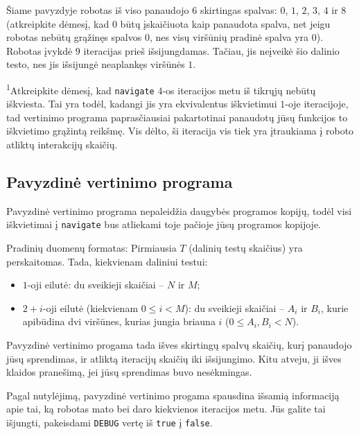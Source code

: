 \documentclass[12pt]{article}
\begin{document}
Šiame pavyzdyje robotas iš viso panaudojo $6$ skirtingas spalvas: $0$, $1$, $2$, $3$, $4$ ir $8$ (atkreipkite dėmesį, kad $0$ būtų įskaičiuota kaip panaudota spalva, net jeigu robotas nebūtų grąžinęs spalvos $0$, nes visų viršūnių pradinė spalva yra $0$). Robotas įvykdė $9$ iteracijas prieš išsijungdamas. Tačiau, jis neįveikė šio dalinio testo, nes jis išsijungė neaplankęs viršūnės $1$.

\textsuperscript{1}Atkreipkite dėmesį, kad  \texttt{navigate} $4$-os iteracijos metu iš tikrųjų nebūtų iškviesta. Tai yra todėl, kadangi jis yra ekvivalentus iškvietimui $1$-oje iteracijoje, tad vertinimo programa paprasčiausiai pakartotinai panaudotų jūsų funkcijos to iškvietimo grąžintą reikšmę. Vis dėlto, ši iteracija vis tiek yra įtraukiama į roboto atliktų interakcijų skaičių.

\subsection{Pavyzdinė vertinimo programa}

Pavyzdinė vertinimo programa nepaleidžia daugybės programos kopijų, todėl visi iškvietimai į \texttt{navigate} bus atliekami toje pačioje jūsų programos kopijoje.


Pradinių duomenų formatas: Pirmiausia $T$ (dalinių testų skaičius) yra perskaitomas. Tada, kiekvienam daliniui testui:
\begin{itemize}
\item $1$-oji eilutė: du sveikieji skaičiai -- $N$ ir $M$;
\item $2+i$-oji eilutė (kiekvienam $0 \leq i < M$): du sveikieji skaičiai -- $A_i$ ir $B_i$, kurie apibūdina dvi viršūnes, kurias jungia briauna $i$ ($0 \leq A_i, B_i < N$).
\end{itemize}

Pavyzdinė vertinimo progama tada išves skirtingų spalvų skaičių, kurį panaudojo jūsų sprendimas, ir atliktą iteracijų skaičių iki išsijungimo. Kitu atveju, ji išves klaidos pranešimą, jei jūsų sprendimas buvo nesėkmingas.

Pagal nutylėjimą, pavyzdinė vertinimo progama spausdina išsamią informaciją apie tai, ką robotas mato bei daro kiekvienos iteracijos metu. Jūs galite tai išjungti, pakeisdami \texttt{DEBUG} vertę iš \texttt{true} į \texttt{false}.
\end{document}
